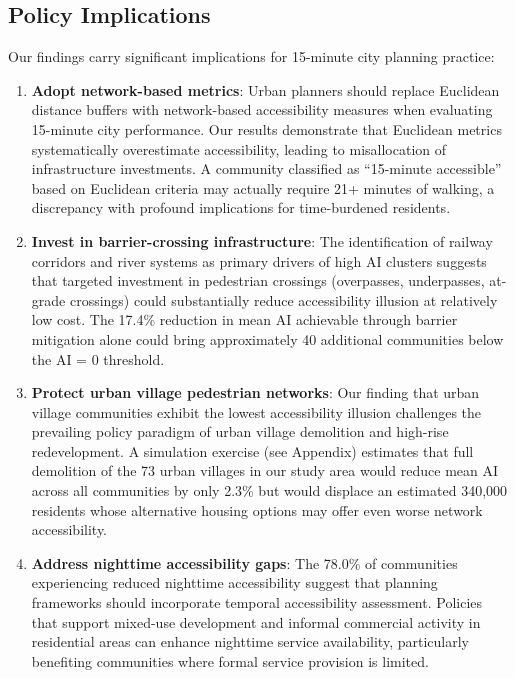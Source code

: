 \documentclass[10pt,conference,compsoc]{IEEEtran}
\begin{document}
\begin{table}[htbp]
\begin{center}
\subsection{Policy Implications}

Our findings carry significant implications for 15-minute city planning practice:

\begin{enumerate}
    \item \textbf{Adopt network-based metrics}: Urban planners should replace Euclidean distance buffers with network-based accessibility measures when evaluating 15-minute city performance. Our results demonstrate that Euclidean metrics systematically overestimate accessibility, leading to misallocation of infrastructure investments. A community classified as ``15-minute accessible'' based on Euclidean criteria may actually require 21+ minutes of walking, a discrepancy with profound implications for time-burdened residents.
    \item \textbf{Invest in barrier-crossing infrastructure}: The identification of railway corridors and river systems as primary drivers of high AI clusters suggests that targeted investment in pedestrian crossings (overpasses, underpasses, at-grade crossings) could substantially reduce accessibility illusion at relatively low cost. The 17.4\% reduction in mean AI achievable through barrier mitigation alone could bring approximately 40 additional communities below the AI = 0 threshold.
    \item \textbf{Protect urban village pedestrian networks}: Our finding that urban village communities exhibit the lowest accessibility illusion challenges the prevailing policy paradigm of urban village demolition and high-rise redevelopment. A simulation exercise (see Appendix) estimates that full demolition of the 73 urban villages in our study area would reduce mean AI across all communities by only 2.3\% but would displace an estimated 340{,}000 residents whose alternative housing options may offer even worse network accessibility.
    \item \textbf{Address nighttime accessibility gaps}: The 78.0\% of communities experiencing reduced nighttime accessibility suggest that planning frameworks should incorporate temporal accessibility assessment. Policies that support mixed-use development and informal commercial activity in residential areas can enhance nighttime service availability, particularly benefiting communities where formal service provision is limited.
\end{enumerate}


\end{center}
\end{table}
\end{document}
